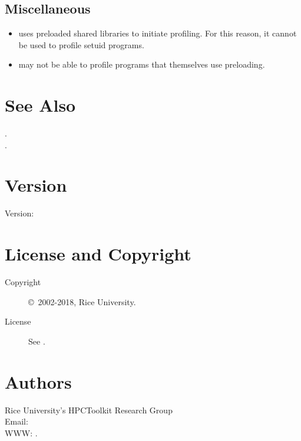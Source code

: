 \documentclass[english]{article}
\begin{document}
\subsection{Miscellaneous}

\begin{itemize}
  \item {} uses preloaded shared libraries to initiate profiling.  For this reason, it cannot be used to profile setuid programs.
  \item {} may not be able to profile programs that themselves use preloading.
\end{itemize}


\section{See Also}

.\\
.


\section{Version}

Version: \Version

\section{License and Copyright}

\begin{description}
\item[Copyright] \copyright\ 2002-2018, Rice University.
\item[License] See .
\end{description}

\section{Authors}

\noindent
Rice University's HPCToolkit Research Group \\
Email:  \\
WWW: .

\LatexManEnd
\end{document}
